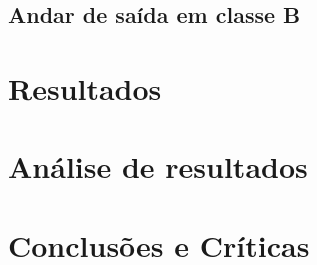 \documentclass[%
  reprint,
  nofootinbib,
  amsmath,amssymb,
  aps,
  10pt,
  a4paper
]{revtex4-1}
\begin{document}
\subsection{Andar de saída em classe B}



\section{Resultados}
\label{s:resul}







\section{Análise de resultados}
\label{s:aresul}





\section{Conclusões e Críticas}
\label{s:conclu}







\nocite{*}
{}
\end{document}
